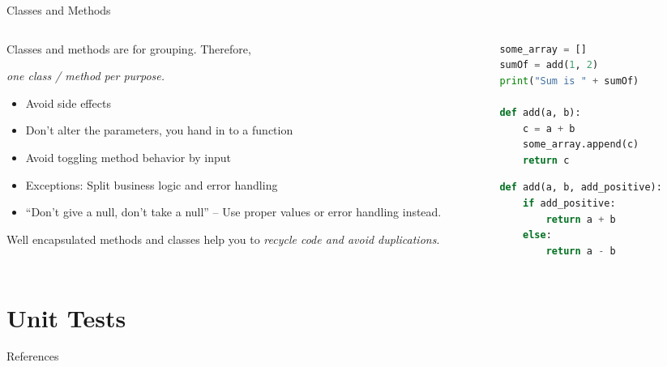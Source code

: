 \documentclass[aspectratio=1610, 9pt]{beamer}
\begin{document}
\begin{frame}[fragile]{Classes and Methods}
    \begin{columns}
        \begin{column}{0.5\textwidth}
            \setlength{\parskip}{9pt}%
            
            Classes and methods are for grouping.
            Therefore, 
            \begin{center}
                \textcolor{tugreen}{\emph{one class / method per purpose.}}
            \end{center}

            \begin{itemize}
                \item Avoid side effects
                \item Don't alter the parameters, you hand in to a function
                \item Avoid toggling method behavior by input
                \item Exceptions: Split business logic and error handling
                \item “Don't give a null, don't take a null” -- Use proper values or error handling instead.
            \end{itemize}

            Well encapsulated methods and classes help you to \textcolor{tugreen}{\emph{recycle code and avoid duplications}}.
        \end{column}
        \begin{column}{0.5\textwidth}
            \setlength{\parskip}{6pt}%
            \begin{lstlisting}[language = Python]
some_array = []
sumOf = add(1, 2)
print("Sum is " + sumOf)

def add(a, b):
    c = a + b
    some_array.append(c)
    return c
            \end{lstlisting}
            
            \begin{lstlisting}[language = Python]
def add(a, b, add_positive):
    if add_positive:
        return a + b
    else:
        return a - b
            \end{lstlisting}
        \end{column}
    \end{columns}
\end{frame}


\section{Unit Tests}

\begin{frame}{References}
    \printbibliography
\end{frame}
\end{document}
